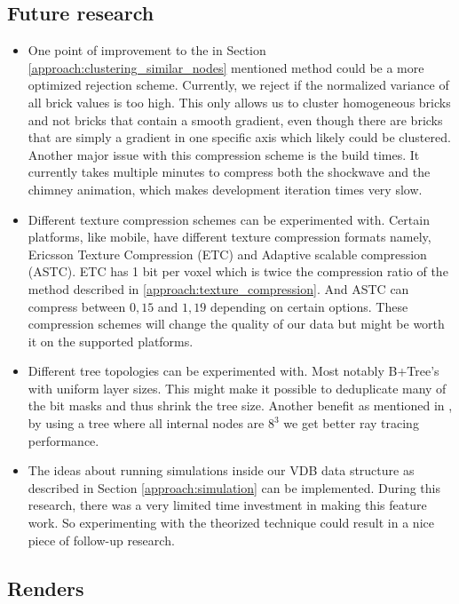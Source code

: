 \subsection{Future research} \label{conclusion:future_research}

\begin{itemize}
    \item One point of improvement to the in Section \ref{approach:clustering_similar_nodes} mentioned method could be a more optimized rejection scheme. Currently, we reject if the normalized variance of all brick values is too high. This only allows us to cluster homogeneous bricks and not bricks that contain a smooth gradient, even though there are bricks that are simply a gradient in one specific axis which likely could be clustered. Another major issue with this compression scheme is the build times. It currently takes multiple minutes to compress both the shockwave and the chimney animation, which makes development iteration times very slow.
    \item Different texture compression schemes can be experimented with. Certain platforms, like mobile, have different texture compression formats namely, Ericsson Texture Compression (ETC) and Adaptive scalable compression (ASTC). ETC has 1 bit per voxel which is twice the compression ratio of the method described in \ref{approach:texture_compression}. And ASTC can compress between $0,15$ and $1,19$ depending on certain options. These compression schemes will change the quality of our data but might be worth it on the supported platforms.
    \item Different tree topologies can be experimented with. Most notably B+Tree's with uniform layer sizes. This might make it possible to deduplicate many of the bit masks and thus shrink the tree size. Another benefit as mentioned in \cite{hoetzlein2016gvdb}, by using a tree where all internal nodes are $8^3$ we get better ray tracing performance.
    \item The ideas about running simulations inside our VDB data structure as described in Section \ref{approach:simulation} can be implemented. During this research, there was a very limited time investment in making this feature work. So experimenting with the theorized technique could result in a nice piece of follow-up research.
\end{itemize}

\subsection{Renders}

